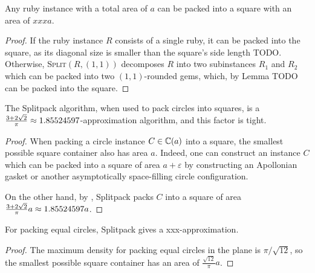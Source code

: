 %
%

\begin{theorem}\label{th:square}
    Any ruby instance with a total area of $a$ can be packed into a square with an area of $xxx a$.
\end{theorem}

\begin{proof}
    If the ruby instance $R$ consists of a single ruby, it can be packed into the square, as its diagonal size is smaller than the square's side length TODO.
    Otherwise, \textsc{Split}$(R, (1,1))$ decomposes $R$ into two subinstances $R_1$ and $R_2$ which can be packed into two $(1,1)$-rounded gems, which, by Lemma TODO can be packed into the square.
\end{proof}

\begin{theorem}
    The Splitpack algorithm, when used to pack circles into squares, is a $\frac{3+2\sqrt{2}}{\pi} \approx 1.85524597$-approximation algorithm, and this factor is tight.
\end{theorem}

\begin{proof}
    When packing a circle instance $C \in \mathbb{C}(a)$ into a square, the smallest possible square container also has area $a$. Indeed, one can construct an instance $C$ which can be packed into a square of area $a+\varepsilon$ by constructing an Apollonian gasket or another asymptotically space-filling circle configuration.

    On the other hand, by , Splitpack packs $C$ into a square of area $\frac{3+2\sqrt{2}}{\pi}a \approx 1.85524597a$.
\end{proof}

\begin{theorem}
    For packing equal circles, Splitpack gives a xxx-approximation.
\end{theorem}

\begin{proof}
    The maximum density for packing equal circles in the plane is $\pi/\sqrt{12}$, so the smallest possible square container has an area of $\frac{\sqrt{12}}{\pi}a$.
\end{proof}
